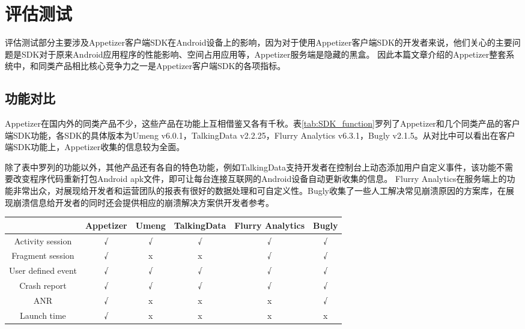 
\chapter{评估测试}
\label{chap:evaluation}

评估测试部分主要涉及Appetizer客户端SDK在Android设备上的影响，因为对于使用Appetizer客户端SDK的开发者来说，他们关心的主要问题是SDK对于原来Android应用程序的性能影响、空间占用应用等，Appetizer服务端是隐藏的黑盒。
因此本篇文章介绍的Appetizer整套系统中，和同类产品相比核心竞争力之一是Appetizer客户端SDK的各项指标。

\section{功能对比}
\label{sec:functions}

Appetizer在国内外的同类产品不少，这些产品在功能上互相借鉴又各有千秋。表\ref{tab:SDK_function}罗列了Appetizer和几个同类产品的客户端SDK功能，各SDK的具体版本为Umeng v6.0.1，TalkingData v2.2.25，Flurry Analytics v6.3.1，Bugly v2.1.5。从对比中可以看出在客户端SDK功能上，Appetizer收集的信息较为全面。

除了表中罗列的功能以外，其他产品还有各自的特色功能，例如TalkingData支持开发者在控制台上动态添加用户自定义事件，该功能不需要改变程序代码重新打包Android apk文件，即可让每台连接互联网的Android设备自动更新收集的信息。
Flurry Analytics在服务端上的功能非常出众，对展现给开发者和运营团队的报表有很好的数据处理和可自定义性。Bugly收集了一些人工解决常见崩溃原因的方案库，在展现崩溃信息给开发者的同时还会提供相应的崩溃解决方案供开发者参考。

\begin{table}[!hpb]
	\centering
	\begin{tabular}{c c c c c c} \toprule
		 & Appetizer & Umeng & TalkingData & Flurry Analytics & Bugly\\ \midrule
		Activity session & √ & √ & √ & √ & √ \\
		Fragment session & √ & x & x & √ & √ \\
		User defined event & √ & √ & √ & √ & √ \\
		Crash report & √ & √ & √ & √ & √ \\
		ANR & √ & x & x & x & √ \\
		Launch time & √ & x & x & x & x \\ \bottomrule
	\end{tabular}
\end{table}

